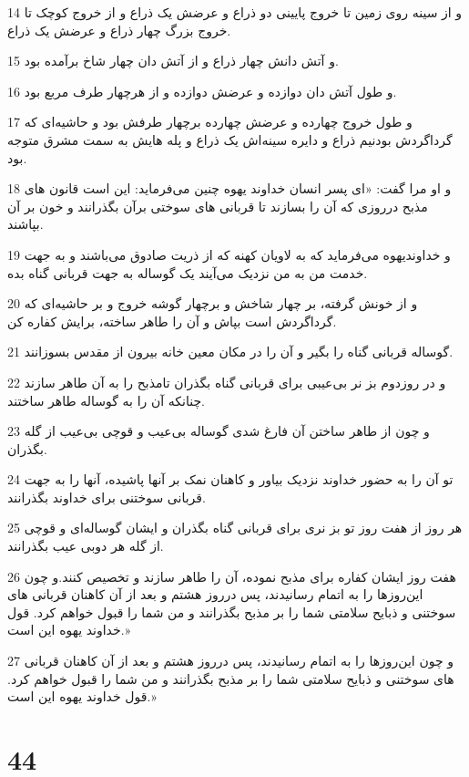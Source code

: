 \par 14 و از سینه روی زمین تا خروج پایینی دو ذراع و عرضش یک ذراع و از خروج کوچک تا خروج بزرگ چهار ذراع و عرضش یک ذراع.
\par 15 و آتش دانش چهار ذراع و از آتش دان چهار شاخ برآمده بود.
\par 16 و طول آتش دان دوازده و عرضش دوازده و از هر‌چهار طرف مربع بود.
\par 17 و طول خروج چهارده و عرضش چهارده برچهار طرفش بود و حاشیه‌ای که گرداگردش بودنیم ذراع و دایره سینه‌اش یک ذراع و پله هایش به سمت مشرق متوجه بود.
\par 18 و او مرا گفت: «ای پسر انسان خداوند یهوه چنین می‌فرماید: این است قانون های مذبح درروزی که آن را بسازند تا قربانی های سوختی برآن بگذرانند و خون بر آن بپاشند.
\par 19 و خداوندیهوه می‌فرماید که به لاویان کهنه که از ذریت صادوق می‌باشند و به جهت خدمت من به من نزدیک می‌آیند یک گوساله به جهت قربانی گناه بده.
\par 20 و از خونش گرفته، بر چهار شاخش و برچهار گوشه خروج و بر حاشیه‌ای که گرداگردش است بپاش و آن را طاهر ساخته، برایش کفاره کن.
\par 21 گوساله قربانی گناه را بگیر و آن را در مکان معین خانه بیرون از مقدس بسوزانند.
\par 22 و در روزدوم بز نر بی‌عیبی برای قربانی گناه بگذران تامذبح را به آن طاهر سازند چنانکه آن را به گوساله طاهر ساختند.
\par 23 و چون از طاهر ساختن آن فارغ شدی گوساله بی‌عیب و قوچی بی‌عیب از گله بگذران.
\par 24 تو آن را به حضور خداوند نزدیک بیاور و کاهنان نمک بر آنها پاشیده، آنها را به جهت قربانی سوختنی برای خداوند بگذرانند.
\par 25 هر روز از هفت روز تو بز نری برای قربانی گناه بگذران و ایشان گوساله‌ای و قوچی از گله هر دوبی عیب بگذرانند.
\par 26 هفت روز ایشان کفاره برای مذبح نموده، آن را طاهر سازند و تخصیص کنند.و چون این‌روزها را به اتمام رسانیدند، پس درروز هشتم و بعد از آن کاهنان قربانی های سوختنی و ذبایح سلامتی شما را بر مذبح بگذرانند و من شما را قبول خواهم کرد. قول خداوند یهوه این است.»
\par 27 و چون این‌روزها را به اتمام رسانیدند، پس درروز هشتم و بعد از آن کاهنان قربانی های سوختنی و ذبایح سلامتی شما را بر مذبح بگذرانند و من شما را قبول خواهم کرد. قول خداوند یهوه این است.»

\chapter{44}

